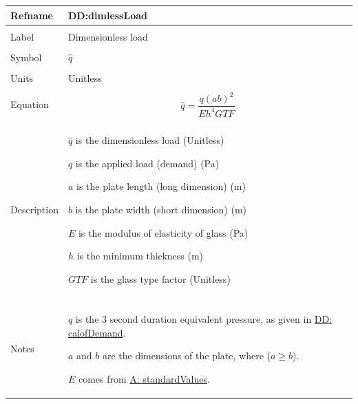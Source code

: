 \documentclass[12pt]{article}
\begin{document}
\vspace{\baselineskip}
\noindent
\begin{minipage}{\textwidth}
\begin{tabular}{>{\raggedright}p{}>{\raggedright\arraybackslash}p{}}
\toprule \textbf{Refname} & \textbf{DD:dimlessLoad}
\label{DD:dimlessLoad}
\\ \midrule \\
Label & Dimensionless load
        
\\ \midrule \\
Symbol & $\hat{q}$
         
\\ \midrule \\
Units & Unitless
        
\\ \midrule \\
Equation & \begin{displaymath}
           \hat{q}=\frac{q \left(a b\right)^{2}}{E h^{4} GTF}
           \end{displaymath}
\\ \midrule \\
Description & \begin{symbDescription}
              \item{$\hat{q}$ is the dimensionless load (Unitless)}
              \item{$q$ is the applied load (demand) (Pa)}
              \item{$a$ is the plate length (long dimension) (m)}
              \item{$b$ is the plate width (short dimension) (m)}
              \item{$E$ is the modulus of elasticity of glass (Pa)}
              \item{$h$ is the minimum thickness (m)}
              \item{$GTF$ is the glass type factor (Unitless)}
              \end{symbDescription}
\\ \midrule \\
Notes & $q$ is the 3 second duration equivalent pressure, as given in \hyperref[DD:calofDemand]{DD: calofDemand}.
        
        $a$ and $b$ are the dimensions of the plate, where ($a\geq{}b$).
        
        $E$ comes from \hyperref[assumpSV]{A: standardValues}.
        

\end{tabular}
\end{minipage}
\end{document}
